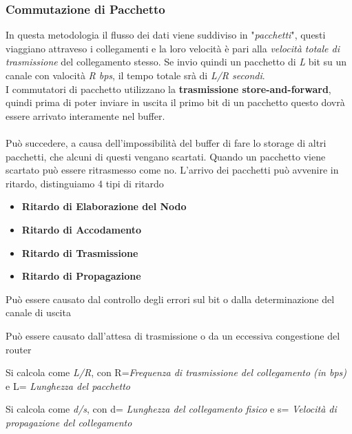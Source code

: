 \documentclass{article}
\newcounter{subsubsubsection}[subsubsection]
\begin{document}
            \subsubsection{Commutazione di Pacchetto}
                In questa metodologia il flusso dei dati viene suddiviso in "\textit{pacchetti}", questi viaggiano attraveso i collegamenti e la loro velocità è pari alla \textit{velocità totale di trasmissione} del collegamento stesso. Se invio quindi un pacchetto di \textit{L} bit su un canale con valocità \textit{R bps}, il tempo totale srà di \textit{L/R secondi}.\\
                I commutatori di pacchetto utilizzano la \textbf{trasmissione store-and-forward}, quindi prima di poter inviare in uscita il primo bit di un pacchetto questo dovrà essere arrivato interamente nel buffer.\\                \\
                Può succedere, a causa dell'impossibilità del buffer di fare lo storage di altri pacchetti, che alcuni di questi vengano scartati. Quando un pacchetto viene scartato può essere ritrasmesso come no.\newpage
                L'arrivo dei pacchetti può avvenire in ritardo, distinguiamo 4 tipi di ritardo
                \begin{itemize}
                    \item \textbf{Ritardo di Elaborazione del Nodo}
                    \item \textbf{Ritardo di Accodamento}
                    \item \textbf{Ritardo di Trasmissione}
                    \item \textbf{Ritardo di Propagazione}
                \end{itemize}

                    Può essere causato dal controllo degli errori sul bit o dalla determinazione del canale di uscita

                    Può essere causato dall'attesa di trasmissione o da un eccessiva congestione del router

                    Si calcola come \textit{L/R}, con R=\textit{Frequenza di trasmissione del collegamento (in bps)} e L= \textit{Lunghezza del pacchetto}

                    Si calcola come \textit{d/s}, con d= \textit{Lunghezza del collegamento fisico} e s= \textit{Velocità di propagazione del collegamento}
\end{document}
